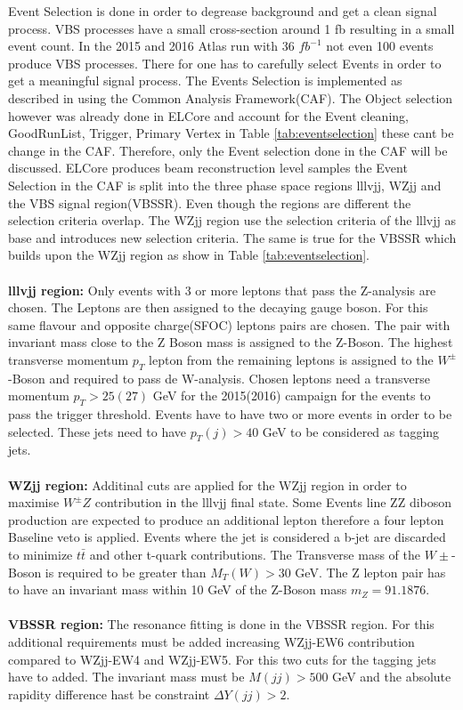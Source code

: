 \documentclass[../Bachelorarbeit.tex]{subfiles}
\begin{document}
Event Selection is done in order to degrease background and get a clean signal process. VBS processes have
a small cross-section around 1 fb resulting in a small event count. In the 2015 and 2016 Atlas
run with 36 $fb^{-1}$ not even 100 events produce VBS processes.
There for one has to carefully select Events in order to get a meaningful signal process. The Events Selection is implemented 
as described in \cite{Bittrich.27.05.2020} using the Common Analysis Framework(CAF). The Object selection however was already done in ELCore
and account for the Event cleaning, GoodRunList, Trigger, Primary Vertex in Table \ref{tab:eventselection} these cant be change in the CAF.
Therefore, only the Event selection done in the CAF will be discussed. ELCore produces beam reconstruction
level samples the Event Selection in the CAF is split into the three phase space regions lllvjj, WZjj and the VBS signal region(VBSSR).
Even though the regions are different the selection criteria overlap. The WZjj region use the selection criteria of
the lllvjj as base and introduces new selection criteria.
The same is true for the VBSSR which builds upon the WZjj region as show in Table \ref{tab:eventselection}.
\\\\
\textbf{lllvjj region:} Only events with 3 or more leptons that pass the Z-analysis are chosen. The Leptons are then assigned to the decaying gauge boson.
For this same flavour and opposite charge(SFOC) leptons pairs are chosen. The pair with invariant mass close to the Z Boson mass is assigned to the Z-Boson.
The highest transverse momentum $p_{T}$ lepton from the remaining leptons is assigned to the $W^{\pm}$-Boson and required to pass de W-analysis.
Chosen leptons need a transverse momentum $p_{T} > 25(27)$ GeV for the 2015(2016) campaign for the events to pass the trigger threshold. 
Events have to have two or more events in order to be selected. These jets need to have $p_{T}(j)>40$ GeV to be considered as tagging jets. 
\\\\
\textbf{WZjj region:} Additinal cuts are applied for the WZjj region in order to maximise $W^{\pm}Z$ contribution in the lllvjj final state.
Some Events line ZZ diboson production are expected to produce an additional lepton therefore a four lepton Baseline veto is applied.
Events where the jet is considered a b-jet are discarded to minimize $t\bar{t}$ and other t-quark contributions.
The Transverse mass of the $W{\pm}$-Boson is required to be greater than $M_{T}(W)>30$ GeV.
The Z lepton pair has to have an invariant mass within 10 GeV of the Z-Boson mass $m_{Z}=91.1876$.
\\\\
\textbf{VBSSR region:} The resonance fitting is done in the VBSSR region. For this additional requirements must be added
increasing WZjj-EW6 contribution compared to WZjj-EW4 and WZjj-EW5. For this two cuts for the tagging jets have to added. The invariant mass must be
$M(jj)>500$ GeV and the absolute rapidity difference hast be constraint $\Delta Y(jj) >2$.
\\\\
\end{document}
